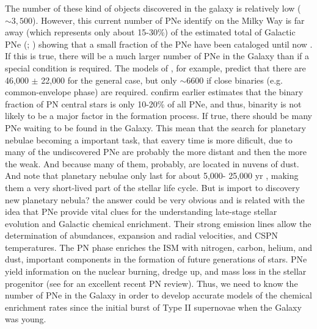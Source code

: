 \documentclass[fleqn,usenatbib]{mnras}
\begin{document}
The number of these kind of objects discovered in the galaxy is relatively low (\(\sim 3,500\)).
However, this current number of PNe identify on the Milky Way is far away (which represents only about 15-30\%) of the estimated
total of Galactic PNe (\citealp{Frew:2008}; \citealp{Jacoby:2010}) showing that a small fraction
of the PNe have been cataloged until now \citep{Frew:2017}.
If this is true, there will be a much larger
number of PNe in the Galaxy than if a special condition
is required. The models of \citet{Moe:2006}, for
example, predict that there are 46,000 $\pm$ 22,000 for the general case,
but only $\sim$6600 \citep{Marco:2005} if
close binaries (e.g. common-envelope phase) are required.
\citet{Miszalski:2009} confirm earlier estimates that the
binary fraction of PN central stars is only 10-20\% of all
PNe, and thus, binarity is not likely to be a major factor in
the formation process. If true, there should be many PNe
waiting to be found in the Galaxy. This mean that the search for planetary nebulae
becoming a important task, that eavery time is more dificult, due to many of
the undiscovered PNe are probably
the more distant and then the more the weak. And because many of them, probably, are located
in nuvens of dust. And note that planetary nebulae only last for about 5,000-
25,000 yr \citep{Badenes:2015}, making them a very short-lived part of the stellar life cycle.
But is import to discovery new planetary nebula? the answer could be very obvious and is
related with the idea that PNe provide vital clues for the understanding late-stage stellar
evolution and Galactic chemical enrichment. Their strong emission lines allow the determination
of abundances, expansion and radial velocities, and
CSPN temperatures. The PN phase
enriches the ISM with nitrogen, carbon, helium, and dust,
important components in the formation of future generations
of stars. PNe yield information on the nuclear
burning, dredge up, and mass loss in the stellar progenitor
(see \citealp{Kwitter:2022} for an excellent recent PN
review). Thus, we need to know the number of PNe in
the Galaxy in order to develop accurate models of the
chemical enrichment rates since the initial burst of Type II
supernovae when the Galaxy was young.
\end{document}
